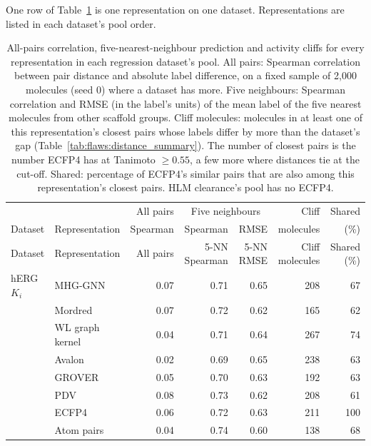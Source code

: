 One row of Table~\ref{tab:flaws:distance_per_rep} is one representation on one dataset. Representations are listed in each dataset's pool order.

\begin{longtable}{llrrrrr}
\caption{All-pairs correlation, five-nearest-neighbour prediction and activity cliffs for every representation in each regression dataset's pool. All pairs: Spearman correlation between pair distance and absolute label difference, on a fixed sample of 2,000 molecules (seed 0) where a dataset has more. Five neighbours: Spearman correlation and RMSE (in the label's units) of the mean label of the five nearest molecules from other scaffold groups. Cliff molecules: molecules in at least one of this representation's closest pairs whose labels differ by more than the dataset's gap (Table~\ref{tab:flaws:distance_summary}). The number of closest pairs is the number ECFP4 has at Tanimoto $\geq 0.55$, a few more where distances tie at the cut-off. Shared: percentage of ECFP4's similar pairs that are also among this representation's closest pairs. HLM clearance's pool has no ECFP4.}\label{tab:flaws:distance_per_rep}\\
\toprule
 & & All pairs & \multicolumn{2}{c}{Five neighbours} & Cliff & Shared \\
Dataset & Representation & Spearman & Spearman & RMSE & molecules & (\%) \\
\midrule
\endfirsthead
\toprule
Dataset & Representation & All pairs & 5-NN Spearman & 5-NN RMSE & Cliff molecules & Shared (\%) \\
\midrule
\endhead
\bottomrule
\endfoot
hERG $K_i$ & MHG-GNN & 0.07 & 0.71 & 0.65 & 208 & 67 \\
 & Mordred & 0.07 & 0.72 & 0.62 & 165 & 62 \\
 & WL graph kernel & 0.04 & 0.71 & 0.64 & 267 & 74 \\
 & Avalon & 0.02 & 0.69 & 0.65 & 238 & 63 \\
 & GROVER & 0.05 & 0.70 & 0.63 & 192 & 63 \\
 & PDV & 0.08 & 0.73 & 0.62 & 208 & 61 \\
 & ECFP4 & 0.06 & 0.72 & 0.63 & 211 & 100 \\
 & Atom pairs & 0.04 & 0.74 & 0.60 & 138 & 68 \\

\end{longtable}
